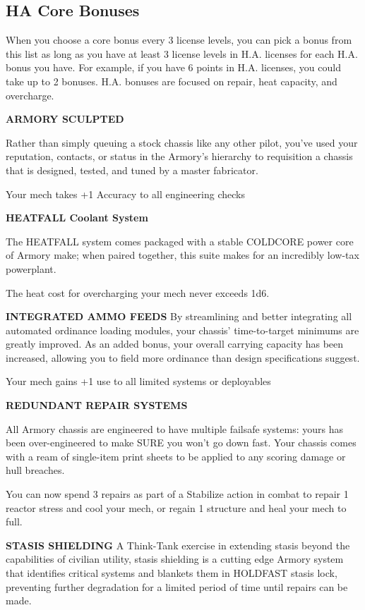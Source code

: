 \subsection{HA Core Bonuses}

When you choose a core bonus every 3 license levels, you can pick a bonus from this list as long as you have at least 3 license levels in H.A. licenses for each H.A. bonus you have. For example, if you have 6 points in H.A. licenses, you could take up to 2 bonuses. H.A. bonuses are focused on repair, heat capacity, and overcharge.


\textbf{ARMORY SCULPTED}

Rather than simply queuing a stock chassis like any other pilot, you've used your reputation, contacts, or status in the Armory's hierarchy to requisition a chassis that is designed, tested, and tuned by a master fabricator.

Your mech takes +1 Accuracy to all engineering checks

\textbf{HEATFALL Coolant System}

The HEATFALL system comes packaged with a stable COLDCORE power core of Armory make; when paired together, this suite makes for an incredibly low-tax powerplant.

The heat cost for overcharging your mech never exceeds 1d6.


\textbf{INTEGRATED AMMO FEEDS}
By streamlining and better integrating all automated ordinance loading modules, your chassis' time-to-target minimums are greatly improved. As an added bonus, your overall carrying capacity has been increased, allowing you to field more ordinance than design specifications suggest.

Your mech gains +1 use to all limited systems or deployables


\textbf{REDUNDANT REPAIR SYSTEMS}

All Armory chassis are engineered to have multiple failsafe systems: yours has been over-engineered to make SURE you won't go down fast. Your chassis comes with a ream of single-item print sheets to be applied to any scoring damage or hull breaches.

You can now spend 3 repairs as part of a Stabilize action in combat to repair 1 reactor stress and cool your mech, or regain 1 structure and heal your mech to full.


\textbf{STASIS SHIELDING}
A Think-Tank exercise in extending stasis beyond the capabilities of civilian utility, stasis shielding is a cutting edge Armory system that identifies critical systems and blankets them in HOLDFAST stasis lock, preventing further degradation for a limited period of time until repairs can be made.

